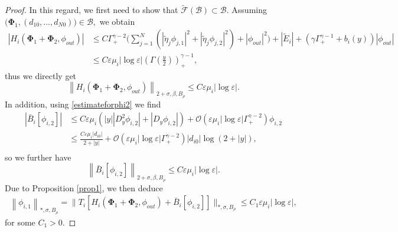 \documentclass[11pt,reqno,a4paper]{amsart}
\numberwithin{equation}{section}
\newcommand{\ve}{\varepsilon}
\begin{document}
\begin{proof}
 In this regard, we first need to show that $\widetilde{\mathcal{F}}\left(\mathcal{B}\right)\subset \mathcal{B}$. Assuming $\big(\mathbf{\Phi}_1,\left(d_{10},\dots,d_{N0}\right)\big)\in \mathcal{B},$ we obtain
\begin{equation*}
\begin{aligned}
\left|H_i\left(\mathbf{\Phi}_1+\mathbf{\Phi}_2,\phi_{out}\right)\right| &\leq C\Gamma^{\gamma-2}_{+}\bigg(\sum_{j=1}^{N}\left(|\tilde{\eta}_j\phi_{j,1}|^2+|\tilde{\eta}_j\phi_{j,2}|^2\right)+|\phi_{out}|^2\bigg) + |\widetilde{E}_i| +\left(\gamma\Gamma^{\gamma-1}_{+}+b_i(y)\right)|\phi_{out}|\\
&\leq C\ve\mu_i|\log\ve| \left(\Gamma\left(\frac{y}{2}\right)\right)^{\gamma-1}_{+},
\end{aligned}
\end{equation*}
thus we directly get \[\left\|H_i\left(\mathbf{\Phi}_1+\mathbf{\Phi}_2,\phi_{out}\right)\right\|_{2+\sigma,\beta,B_{\rho}} \leq C \ve\mu_i|\log\ve|.
\]
In addition, using \eqref{estimateforphi2} we find
\begin{equation*}
\begin{aligned}
\left|\bar{B}_i[\phi_{i,2}]\right| &\leq C\ve\mu_i\left(|y||D^{2}_{y}\phi_{i,2}|+|D_y \phi_{i,2}|\right)+\mathcal{O}\left(\ve\mu_i |\log\ve|\Gamma^{\gamma-2}_{+}\right)\phi_{i,2}\\
&\leq \frac{C\ve\mu_i|d_{i0}|}{2+|y|}+\mathcal{O}\left(\ve\mu_i|\log\ve|\Gamma^{\gamma-2}_{+}\right)|d_{i0}|\log(2+|y|),\\
\end{aligned}
\end{equation*}
so we further have
\[\left\|\bar{B}_i[\phi_{i,2}]\right\|_{2+\sigma,\beta,B_{\rho}}\leq C\ve\mu_i|\log\ve|.\]
Due to Proposition \ref{prop1}, we then deduce 
\begin{equation}\label{firsterr71}
\begin{aligned}
\left\|\phi_{i,1}\right\|_{*,\sigma,B_{\rho}}=\big\|T_i\left[H_i(\mathbf{\Phi}_1+\mathbf{\Phi}_2,\phi_{out})+\bar{B}_i[\phi_{i,2}]\right]\big\|_{*,\sigma,B_{\rho}} \leq C_1\ve\mu_i|\log\ve|,
\end{aligned}
\end{equation}
for some $C_1>0$.


\end{proof}
\end{document}
